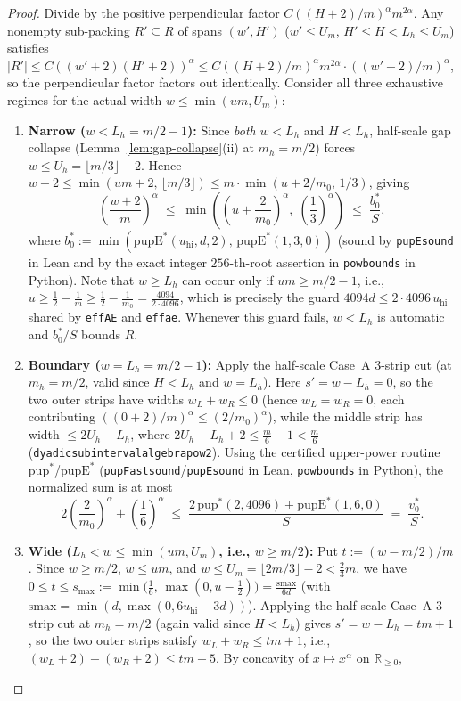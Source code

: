 \documentclass[11pt,reqno]{amsart}
\theoremstyle{plain}
\theoremstyle{definition}
\theoremstyle{remark}
\DeclareRobustCommand{\_}{\ifmmode\text{\textunderscore}\else\textunderscore\allowbreak\fi}
\begin{document}
\begin{proof}
Divide by the positive perpendicular factor $C ((H + 2)/m)^\alpha m^{2\alpha}$. Any nonempty sub-packing $R' \subseteq R$ of spans $(w', H')$ ($w' \le U_m$, $H' \le H < L_h \le U_m$) satisfies $|R'| \le C ((w' + 2)(H' + 2))^\alpha \le C ((H + 2)/m)^\alpha m^{2\alpha} \cdot ((w' + 2)/m)^\alpha$, so the perpendicular factor factors out identically. Consider all three exhaustive regimes for the actual width $w \le \min(u m, U_m)$:
\begin{enumerate}[label=(\roman*),leftmargin=2em]
  \item \textbf{Narrow ($w < L_h = m/2 - 1$):} Since \emph{both} $w < L_h$ and $H < L_h$, half-scale gap collapse (Lemma~\ref{lem:gap-collapse}(ii) at $m_h = m/2$) forces $w \le U_h = \lfloor m/3 \rfloor - 2$. Hence $w + 2 \le \min(u m + 2,\, \lfloor m/3 \rfloor) \le m \cdot \min(u + 2/m_0,\, 1/3)$, giving
  \[
    \left(\frac{w + 2}{m}\right)^{\!\alpha} \;\le\; \min\!\left(\left(u + \frac{2}{m_0}\right)^{\!\alpha},\; \left(\frac{1}{3}\right)^{\!\alpha}\right) \;\le\; \frac{b_0^*}{S},
  \]
  where $b_0^* := \min(\mathrm{pupE}^*(u_{\mathrm{hi}}, d, 2),\, \mathrm{pupE}^*(1, 3, 0))$ (sound by \texttt{pupE\_sound} in Lean and by the exact integer $256$-th-root assertion in \texttt{pow\_bounds\_123\_256} in Python). Note that $w \ge L_h$ can occur only if $u m \ge m/2 - 1$, i.e., $u \ge \frac{1}{2} - \frac{1}{m} \ge \frac{1}{2} - \frac{1}{m_0} = \frac{4094}{2 \cdot 4096}$, which is precisely the guard $4094 d \le 2 \cdot 4096\, u_{\mathrm{hi}}$ shared by \texttt{effAE} and \texttt{eff\_a\_e}. Whenever this guard fails, $w < L_h$ is automatic and $b_0^* / S$ bounds $R$.
  \item \textbf{Boundary ($w = L_h = m/2 - 1$):} Apply the half-scale Case~A $3$-strip cut (at $m_h = m/2$, valid since $H < L_h$ and $w = L_h$). Here $s' = w - L_h = 0$, so the two outer strips have widths $w_L + w_R \le 0$ (hence $w_L = w_R = 0$, each contributing $((0 + 2)/m)^\alpha \le (2/m_0)^\alpha$), while the middle strip has width $\le 2 U_h - L_h$, where $2 U_h - L_h + 2 \le \frac{m}{6} - 1 < \frac{m}{6}$ (\texttt{dyadic\_subinterval\_algebra\_pow2}). Using the certified upper-power routine $\mathrm{pup}^*$/$\mathrm{pupE}^*$ (\texttt{pupFast\_sound}/\texttt{pupE\_sound} in Lean, \texttt{pow\_bounds\_123\_256} in Python), the normalized sum is at most
  \[
    2\left(\frac{2}{m_0}\right)^{\!\alpha} + \left(\frac{1}{6}\right)^{\!\alpha} \;\le\; \frac{2\,\mathrm{pup}^*(2, 4096) + \mathrm{pupE}^*(1, 6, 0)}{S} \;=\; \frac{v_0^*}{S}.
  \]
  \item \textbf{Wide ($L_h < w \le \min(u m, U_m)$, i.e., $w \ge m/2$):} Put $t := (w - m/2)/m$. Since $w \ge m/2$, $w \le u m$, and $w \le U_m = \lfloor 2m/3 \rfloor - 2 < \frac{2}{3}m$, we have $0 \le t \le s_{\max} := \min\bigl(\frac{1}{6},\, \max(0, u - \frac{1}{2})\bigr) = \frac{\mathrm{smax}}{6d}$ (with $\mathrm{smax} = \min(d, \max(0, 6 u_{\mathrm{hi}} - 3d))$). Applying the half-scale Case~A $3$-strip cut at $m_h = m/2$ (again valid since $H < L_h$) gives $s' = w - L_h = t m + 1$, so the two outer strips satisfy $w_L + w_R \le t m + 1$, i.e., $(w_L + 2) + (w_R + 2) \le t m + 5$. By concavity of $x \mapsto x^\alpha$ on $\mathbb{R}_{\ge 0}$,

\end{enumerate}
\end{proof}
\end{document}
